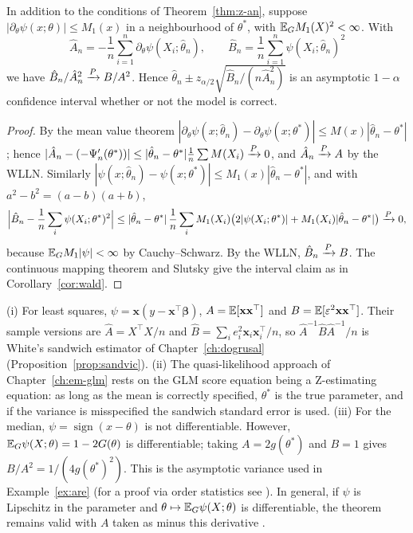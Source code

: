 \documentclass[main.tex]{subfiles}
\begin{document}
\begin{proposition}\label{prop:sandvic-genel}
In addition to the conditions of Theorem~\ref{thm:z-an}, suppose $|\partial_\theta\psi(x;\theta)|\le M_1(x)$ in a neighbourhood of $\theta^*$, with $\mathbb{E}_GM_1(X)^2<\infty$. With
\[
\hat A_n=-\frac1n\sum_{i=1}^n\partial_\theta\psi(X_i;\hat\theta_n),\qquad\hat B_n=\frac1n\sum_{i=1}^n\psi(X_i;\hat\theta_n)^2
\]
we have $\hat B_n/\hat A_n^2\xrightarrow{P} B/A^2$. Hence $\hat\theta_n\pm z_{\alpha/2}\sqrt{\hat B_n/(n\hat A_n^2)}$ is an asymptotic $1-\alpha$ confidence interval whether or not the model is correct.
\end{proposition}
\begin{proof}
By the mean value theorem $|\partial_\theta\psi(x;\hat\theta_n)-\partial_\theta\psi(x;\theta^*)|\le M(x)|\hat\theta_n-\theta^*|$; hence $|\hat A_n-(-\Psi_n'(\theta^*))|\le|\hat\theta_n-\theta^*|\frac1n\sum M(X_i)\xrightarrow{P}0$, and $\hat A_n\xrightarrow{P} A$ by the WLLN. Similarly $|\psi(x;\hat\theta_n)-\psi(x;\theta^*)|\le M_1(x)|\hat\theta_n-\theta^*|$, and with $a^2-b^2=(a-b)(a+b)$,
\[
\Big|\hat B_n-\frac1n\sum_i\psi(X_i;\theta^*)^2\Big|\le|\hat\theta_n-\theta^*|\,\frac1n\sum_iM_1(X_i)\big(2|\psi(X_i;\theta^*)|+M_1(X_i)|\hat\theta_n-\theta^*|\big)\xrightarrow{P}0,
\]
because $\mathbb{E}_GM_1|\psi|<\infty$ by Cauchy--Schwarz. By the WLLN, $\hat B_n\xrightarrow{P} B$. The continuous mapping theorem and Slutsky give the interval claim as in Corollary~\ref{cor:wald}.
\end{proof}

\begin{remark}
(i) For least squares, $\psi=\mathbf x(y-\mathbf x^\top\bm\beta)$, $A=\mathbb{E}[\mathbf x\mathbf x^\top]$ and $B=\mathbb{E}[\varepsilon^2\mathbf x\mathbf x^\top]$. Their sample versions are $\hat A=X^\top X/n$ and $\hat B=\sum_ie_i^2\mathbf x_i\mathbf x_i^\top/n$, so $\hat A^{-1}\hat B\hat A^{-1}/n$ is White's sandwich estimator of Chapter~\ref{ch:dogrusal} (Proposition~\ref{prop:sandvic}). (ii) The quasi-likelihood approach of Chapter~\ref{ch:em-glm} rests on the GLM score equation being a Z-estimating equation: as long as the mean is correctly specified, $\theta^*$ is the true parameter, and if the variance is misspecified the sandwich standard error is used. (iii) For the median, $\psi=\operatorname{sign}(x-\theta)$ is not differentiable. However, $\mathbb{E}_G\psi(X;\theta)=1-2G(\theta)$ is differentiable; taking $A=2g(\theta^*)$ and $B=1$ gives $B/A^2=1/(4g(\theta^*)^2)$. This is the asymptotic variance used in Example~\ref{ex:are} (for a proof via order statistics see \cite[Chapter~21]{vdv}). In general, if $\psi$ is Lipschitz in the parameter and $\theta\mapsto\mathbb{E}_G\psi(X;\theta)$ is differentiable, the theorem remains valid with $A$ taken as minus this derivative \cite[Theorem~5.21]{vdv}.
\end{remark}
\end{document}
